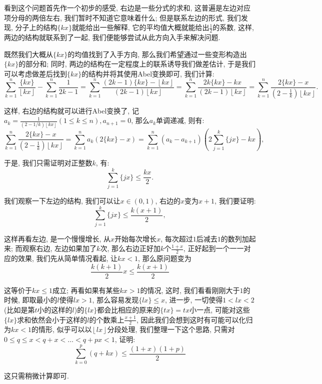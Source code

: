 \documentclass[lang=cn,12pt,thmcnt=section]{elegantbook}
\newcommand{\fl}[1]{\left\lfloor #1\right\rfloor}
\begin{document}
\begin{analysis}
看到这个问题首先作一个初步的感受, 右边是一些分式的求和, 这普遍是左边对应项分母的两倍左右, 我们暂时不知道它意味着什么; 但是联系左边的形式, 我们发现, 分子上的结构$\{kx\}$就能给出一些解释, 它的平均值大概就能给出$\frac{1}{2}$的系数, 这样, 两边的结构就联系到了一起, 我们便能够尝试从此方向入手来解决问题.

既然我们大概从$\{kx\}$的均值找到了入手方向, 那么我们希望通过一些变形构造出$\{kx\}$的部分和; 同时, 两边的结构在一定程度上的联系诱导我们做差估计, 于是我们可以考虑做差后找到$\{kx\}$的结构并将其使用Abel变换即可, 我们计算: 
\[
\sum_{k=1}^n \frac{\{kx\}}{\fl{kx}}- \sum_{k=1}^n \frac{1}{2k-1}=\sum_{k=1}^n \frac{(2k-1)\{kx\}-\fl{kx}}{(2k-1)\fl{kx}}=\sum_{k=1}^n \frac{2k\{kx\}-kx}{(2k-1)\fl{kx}}=\sum_{k=1}^n \frac{2\{kx\}-x}{(2-\frac{1}{k})\fl{kx}}.
\]

这样, 右边的结构就可以进行Abel变换了, 记$a_{k}=\frac{1}{(2-1/k)\fl{kx}}(1\le k\le n),a_{n+1}=0$, 那么$a_k$单调递减, 则有: 
\[
\sum_{k=1}^n \frac{2\{kx\}-x}{(2-\frac{1}{k})\fl{kx}}=\sum_{k=1}^n a_k(2\{kx\}-x)=\sum_{k=1}^{n}(a_k-a_{k+1})\left(2\sum_{j=1}^k \{jx\}-kx\right),
\]

于是, 我们只需证明对正整数$k$, 有: 
\[
\sum_{j=1}^k \{jx\}\le \frac{kx}{2}.
\]

我们观察一下左边的结构, 我们可以让$x\in (0,1)$, 右边的$x$变为$x+1$, 我们要证明: 
\[
\sum_{j=1}^k \{jx\}\le \frac{k(x+1)}{2},
\]

这样再看左边, 是一个慢慢增长, 从$x$开始每次增长$x$, 每次超过$1$后减去$1$的数列加起来; 而观察右边, 左边如果加了$k$次, 那么右边正好加$k$个$\frac{1+x}{2}$, 正好起到一个一一对应的效果, 我们先从简单情况看起, 让$kx<1$, 那么原问题变为
\[
\frac{k(k+1)}{2}x\le \frac{k(x+1)}{2}
\]

这等价于$kx\le 1$成立; 再看如果有某些$kx>1$的情况, 这时, 我们看看刚刚大于$1$的时候, 即取最小的$l$使得$lx>1$, 那么容易发现$\{lx\}\le x$, 进一步, 一切使得$1<lx<2$(比如是第$t$小的这样的$l$)的$\{lx\}$都会比相应的原来的$\{tx\}=tx$小一点, 可能对这些$\{lx\}$求和依然会小于这样的$l$的个数乘上$\frac{x+1}{2}$, 因此我们会想到这时有可能可以化归为$kx<1$的情形, 似乎可以以$\fl{lx}$分段处理, 我们整理一下这个思路, 只需对$0\le q\le x<q+x<\dots{}<q+px<1$, 证明: 
\[
\sum_{k=0}^p (q+kx)\le \frac{(1+x)(1+p)}{2}
\]

这只需稍微计算即可.
\end{analysis}
\end{document}
